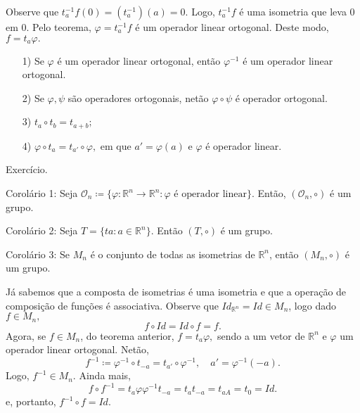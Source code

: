 \documentclass[algebra_notes.tex]{subfiles}
\begin{document}
\begin{proof*}
	Observe que $t_{a}^{-1}f(0)=(t_{a}^{-1})(a)=0.$ Logo, $t_{a}^{-1}f$ é uma isometria que leva 0 em 0. Pelo teorema, $\varphi =t_{a}^{-1}f$
	é um operador linear ortogonal. Deste modo, $f=t_{a}\varphi .$ \qedsymbol
\end{proof*}
\begin{prop*}
	\begin{itemize}
		\item[1)] Se $\varphi $ é um operador linear ortogonal, então $\varphi ^{-1}$ é um operador linear ortogonal.
		\item[2)] Se $\varphi , \psi$ são operadores ortogonais, netão $\varphi\circ{\psi}$ é operador ortogonal.
		\item[3)] $t_{a}\circ{t_{b}}=t_{a+b};$
		\item[4)] $\varphi\circ{t_{a}}=t_{a'}\circ{\varphi },$ em que $a'=\varphi (a)$ e $\varphi $ é operador linear.
	\end{itemize}
\end{prop*}
\begin{proof*}
	Exercício.
\end{proof*}
\begin{crl*}
	Corolário 1: Seja $\mathcal{O}_{n}\coloneqq\{\varphi :\mathbb{R}^{n}\rightarrow \mathbb{R}^{n}: \varphi \text{ é operador linear}\}$.
	Então, $(\mathcal{O}_{n}, \circ)$ é um grupo.
\end{crl*}
\begin{crl*}
	Corolário 2: Seja $T=\{ta:a\in \mathbb{R}^{n}\}$. Então $(T, \circ)$ é um grupo.
\end{crl*}
\begin{crl*}
	Corolário 3: Se $M_{n}$ é o conjunto de todas as isometrias de $\mathbb{R}^{n}$, então $(M_{n}, \circ)$ é um grupo.
\end{crl*}
\begin{proof*}
	Já sabemos que a composta de isometrias é uma isometria e que a operação de composição de funções é associativa.
	Observe que $Id_{\mathbb{R}^{n}}=Id\in M_{n}$, logo dado $f\in M_{n},$
	$$
		f\circ{Id}=Id\circ{f}=f.
	$$
	Agora, se $f\in M_{n}$, do teorema anterior, $f = t_{a}\varphi ,$ sendo a um vetor de $\mathbb{R}^{n}$ e $\varphi $
	um operador linear ortogonal. Netão,
	$$
		f^{-1}\coloneqq\varphi ^{-1}\circ{t_{-a}}=t_{a'}\circ{\varphi ^{-1}},\quad a'=\varphi ^{-1}(-a).
	$$
	Logo, $f^{-1}\in M_{n}.$ Ainda mais,
	$$
		f\circ{f^{-1}} = t_{a}\varphi \varphi ^{-1}t_{-a}=t_{a}t_{-a}=t_{a A}=t_{0}=Id.
	$$
	e, portanto, $f^{-1}\circ{f}=Id.$ \qedsymbol
\end{proof*}
\end{document}
